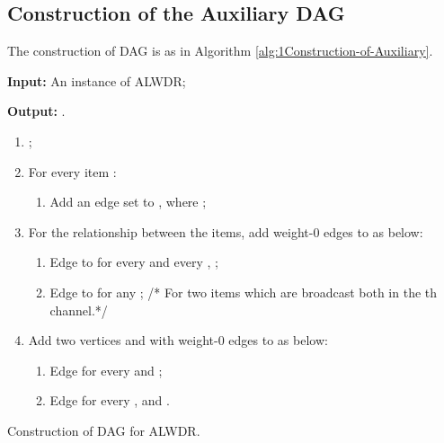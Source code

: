 \documentclass[11pt,english,onecolumn,draftcls]{IEEEtran}
\theoremstyle{plain}
\theoremstyle{plain}
\theoremstyle{plain}
\theoremstyle{plain}
\begin{document}
\subsection{Construction of the Auxiliary DAG }

The construction of DAG  is as in Algorithm \ref{alg:1Construction-of-Auxiliary}.

\begin{algorithm}
\textbf{Input: }An instance of ALWDR;

\textbf{Output:} .
\begin{enumerate}
\item ;
\item For every item :

\begin{enumerate}
\item Add an edge set 
to , where ;
\end{enumerate}
\item For the relationship between the items, add weight-0 edges to 
as below:

\begin{enumerate}
\item Edge  to 
for every  and every , ;
\item Edge  to  for any ;
/{*} For two items which are broadcast both in the th channel.{*}/
\end{enumerate}
\item Add two vertices  and  with weight-0 edges to  as below:

\begin{enumerate}
\item Edge  for every   and ;
\item Edge  for every ,  and .
\end{enumerate}
\end{enumerate}
\protect\caption{\label{alg:1Construction-of-Auxiliary}Construction of DAG for ALWDR. }
\end{algorithm}
\end{document}
